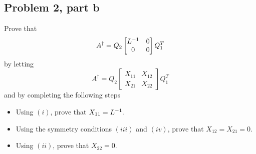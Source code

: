 \subsection{Problem 2, part b}
Prove that 
\[
A^\dag = Q_2 \begin{bmatrix}L^{-1} &0 \\ 0 &0\end{bmatrix}Q_1^T
\]
by letting 
\[
A^\dag = Q_2\begin{bmatrix}X_{11} &X_{12} \\ X_{21} &X_{22}\end{bmatrix}Q_1^T
\]
and by completing the following steps
\begin{itemize}
    \item Using $(i)$, prove that $X_{11} = L^{-1}$.
    \item Using the symmetry conditions $(iii)$ and $(iv)$, prove that $X_{12} = X_{21} = 0$. 
    \item Using $(ii)$, prove that $X_{22} = 0$.
\end{itemize}
\partbreak
